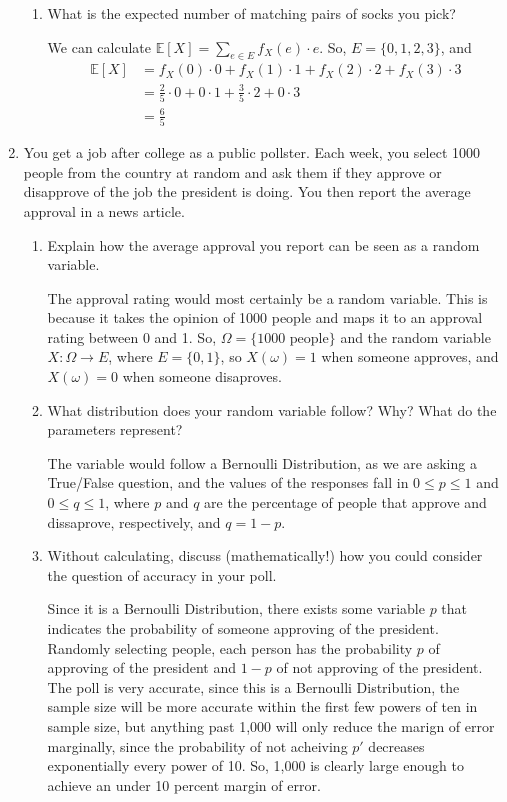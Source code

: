 \documentclass[12pt]{article}
\begin{document}
\begin{enumerate}
\begin{enumerate}
\item What is the expected number of matching pairs of socks you pick?

We can calculate $\mathbb{E}[X] = \sum_{e\in E} f_X(e) \cdot e$. So, $E = \{0, 1, 2, 3\}$, and 
\begin{align*}
\mathbb{E}[X] &= f_X(0)\cdot 0 + f_X(1)\cdot 1 + f_X(2)\cdot 2 + f_X(3)\cdot 3 \\
&= \frac{2}{5}\cdot 0 + 0\cdot 1 + \frac{3}{5}\cdot 2 + 0\cdot 3 \\
&= \frac{6}{5}
\end{align*} 
\end{enumerate}

\item You get a job after college as a public pollster. Each week, you select 1000 people from the country at random and ask them if they approve or disapprove of the job the president is doing. You then report the average approval in a news article.
\begin{enumerate}
\item Explain how the average approval you report can be seen as a random variable.

The approval rating would most certainly be a random variable. This is because it takes the opinion of 1000 people and maps it to an approval rating between 0 and 1. So, $\Omega = \{\text{1000 people}\}$ and the random variable $X:\Omega \to E$, where $E = \{0, 1\}$, so $X(\omega) = 1$ when someone approves, and $X(\omega) = 0$ when someone disaproves.

\item What distribution does your random variable follow? Why? What do the parameters represent?

The variable would follow a Bernoulli Distribution, as we are asking a True/False question, and the values of the responses fall in $0 \leq p \leq 1$ and $0 \leq q \leq 1$, where $p$ and $q$ are the percentage of people that approve and dissaprove, respectively, and $q = 1- p$. 

\item Without calculating, discuss (mathematically!) how you could consider the question of accuracy in your poll.

Since it is a Bernoulli Distribution, there exists some variable $p$ that indicates the probability of someone approving of the president. Randomly selecting people, each person has the probability $p$ of approving of the president and $1-p$ of not approving of the president. The poll is very accurate, since this is a Bernoulli Distribution, the sample size will be more accurate within the first few powers of ten in sample size, but anything past 1,000 will only reduce the marign of error marginally, since the probability of not acheiving $p'$ decreases exponentially every power of 10. So, 1,000 is clearly large enough to achieve an under 10 percent margin of error. 
\end{enumerate}


\end{enumerate}
\end{document}

